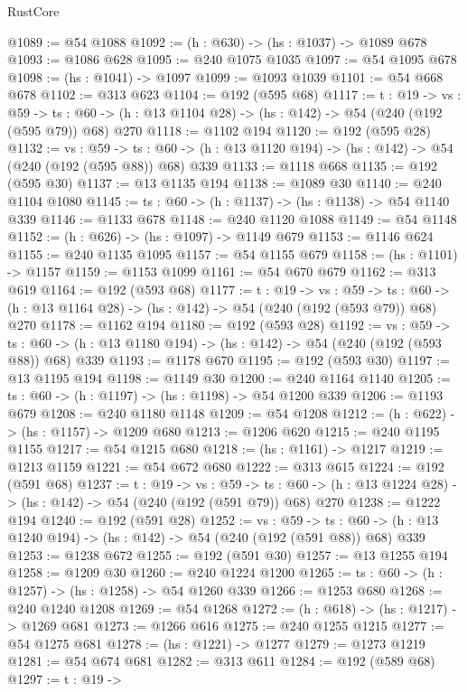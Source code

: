 \begin{lexlean}{RustCore}
\begin{coremodule}
@1089 := @54 @1088
@1092 := (h : @630) -> (hs : @1037) -> @1089 @678
@1093 := @1086 @628
@1095 := @240 @1075 @1035
@1097 := @54 @1095 @678
@1098 := (hs : @1041) -> @1097
@1099 := @1093 @1039
@1101 := @54 @668 @678
@1102 := @313 @623
@1104 := @192 (@595 @68)
@1117 := {t : @19} ->
  {vs : @59} ->
  {ts : @60} -> (h : @13 @1104 @28) -> (hs : @142) -> @54 (@240 (@192 (@595 @79)) @68) @270
@1118 := @1102 @194
@1120 := @192 (@595 @28)
@1132 := {vs : @59} ->
  {ts : @60} -> (h : @13 @1120 @194) -> (hs : @142) -> @54 (@240 (@192 (@595 @88)) @68) @339
@1133 := @1118 @668
@1135 := @192 (@595 @30)
@1137 := @13 @1135 @194
@1138 := @1089 @30
@1140 := @240 @1104 @1080
@1145 := {ts : @60} -> (h : @1137) -> (hs : @1138) -> @54 @1140 @339
@1146 := @1133 @678
@1148 := @240 @1120 @1088
@1149 := @54 @1148
@1152 := (h : @626) -> (hs : @1097) -> @1149 @679
@1153 := @1146 @624
@1155 := @240 @1135 @1095
@1157 := @54 @1155 @679
@1158 := (hs : @1101) -> @1157
@1159 := @1153 @1099
@1161 := @54 @670 @679
@1162 := @313 @619
@1164 := @192 (@593 @68)
@1177 := {t : @19} ->
  {vs : @59} ->
  {ts : @60} -> (h : @13 @1164 @28) -> (hs : @142) -> @54 (@240 (@192 (@593 @79)) @68) @270
@1178 := @1162 @194
@1180 := @192 (@593 @28)
@1192 := {vs : @59} ->
  {ts : @60} -> (h : @13 @1180 @194) -> (hs : @142) -> @54 (@240 (@192 (@593 @88)) @68) @339
@1193 := @1178 @670
@1195 := @192 (@593 @30)
@1197 := @13 @1195 @194
@1198 := @1149 @30
@1200 := @240 @1164 @1140
@1205 := {ts : @60} -> (h : @1197) -> (hs : @1198) -> @54 @1200 @339
@1206 := @1193 @679
@1208 := @240 @1180 @1148
@1209 := @54 @1208
@1212 := (h : @622) -> (hs : @1157) -> @1209 @680
@1213 := @1206 @620
@1215 := @240 @1195 @1155
@1217 := @54 @1215 @680
@1218 := (hs : @1161) -> @1217
@1219 := @1213 @1159
@1221 := @54 @672 @680
@1222 := @313 @615
@1224 := @192 (@591 @68)
@1237 := {t : @19} ->
  {vs : @59} ->
  {ts : @60} -> (h : @13 @1224 @28) -> (hs : @142) -> @54 (@240 (@192 (@591 @79)) @68) @270
@1238 := @1222 @194
@1240 := @192 (@591 @28)
@1252 := {vs : @59} ->
  {ts : @60} -> (h : @13 @1240 @194) -> (hs : @142) -> @54 (@240 (@192 (@591 @88)) @68) @339
@1253 := @1238 @672
@1255 := @192 (@591 @30)
@1257 := @13 @1255 @194
@1258 := @1209 @30
@1260 := @240 @1224 @1200
@1265 := {ts : @60} -> (h : @1257) -> (hs : @1258) -> @54 @1260 @339
@1266 := @1253 @680
@1268 := @240 @1240 @1208
@1269 := @54 @1268
@1272 := (h : @618) -> (hs : @1217) -> @1269 @681
@1273 := @1266 @616
@1275 := @240 @1255 @1215
@1277 := @54 @1275 @681
@1278 := (hs : @1221) -> @1277
@1279 := @1273 @1219
@1281 := @54 @674 @681
@1282 := @313 @611
@1284 := @192 (@589 @68)
@1297 := {t : @19} ->

\end{coremodule}
\end{lexlean}
